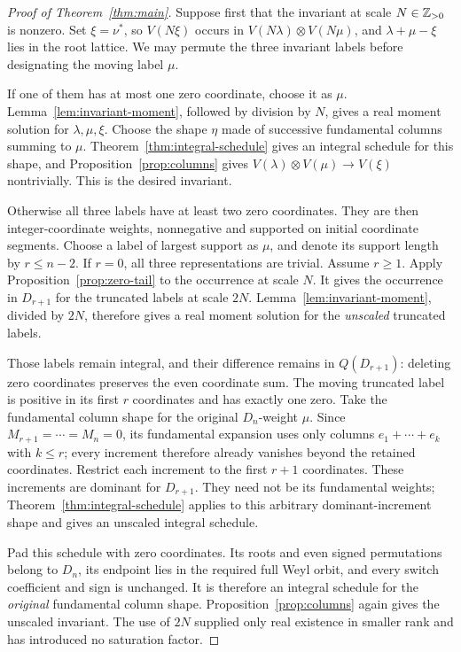\begin{proof}[Proof of Theorem~\ref{thm:main}]
Suppose first that the invariant at scale \(N\in\mathbb Z_{>0}\) is nonzero.
Set \(\xi=\nu^*\), so \(V(N\xi)\) occurs in
\(V(N\lambda)\otimes V(N\mu)\), and
\(\lambda+\mu-\xi\) lies in the root lattice.
We may permute the three invariant labels before designating the
moving label \(\mu\).

If one of them has at most one zero coordinate, choose it as \(\mu\).
Lemma~\ref{lem:invariant-moment}, followed by division by \(N\),
gives a real moment solution for \(\lambda,\mu,\xi\).
Choose the shape \(\eta\) made of successive fundamental columns
summing to \(\mu\).
Theorem~\ref{thm:integral-schedule} gives an integral schedule for
this shape, and Proposition~\ref{prop:columns} gives
\(V(\lambda)\otimes V(\mu)\longrightarrow V(\xi)\) nontrivially.
This is the desired invariant.

Otherwise all three labels have at least two zero coordinates.
They are then integer-coordinate weights, nonnegative and supported
on initial coordinate segments.  Choose a label of largest support
as \(\mu\), and denote its support length by \(r\le n-2\).
If \(r=0\), all three representations are trivial.  Assume \(r\ge1\).
Apply Proposition~\ref{prop:zero-tail} to the occurrence at scale
\(N\).  It gives the occurrence in \(D_{r+1}\) for the truncated
labels at scale \(2N\).  Lemma~\ref{lem:invariant-moment}, divided
by \(2N\), therefore gives a real moment solution for the
\emph{unscaled} truncated labels.

Those labels remain integral, and their difference remains in
\(Q(D_{r+1})\): deleting zero coordinates preserves the even
coordinate sum.  The moving truncated label is positive in its first
\(r\) coordinates and has exactly one zero.  Take the fundamental
column shape for the original \(D_n\)-weight \(\mu\).
Since \(M_{r+1}=\cdots=M_n=0\), its fundamental expansion uses
only columns \(e_1+\cdots+e_k\) with \(k\le r\); every increment
therefore already vanishes beyond the retained coordinates.
Restrict each increment to the first \(r+1\) coordinates.
These increments are dominant for \(D_{r+1}\).  They need not be its
fundamental weights; Theorem~\ref{thm:integral-schedule} applies to
this arbitrary dominant-increment shape and gives an unscaled
integral schedule.

Pad this schedule with zero coordinates.  Its roots and even signed
permutations belong to \(D_n\), its endpoint lies in the required
full Weyl orbit, and every switch coefficient and sign is unchanged.
It is therefore an integral schedule for the \emph{original}
fundamental column shape.  Proposition~\ref{prop:columns} again
gives the unscaled invariant.  The use of \(2N\) supplied only real
existence in smaller rank and has introduced no saturation factor.


\end{proof}
